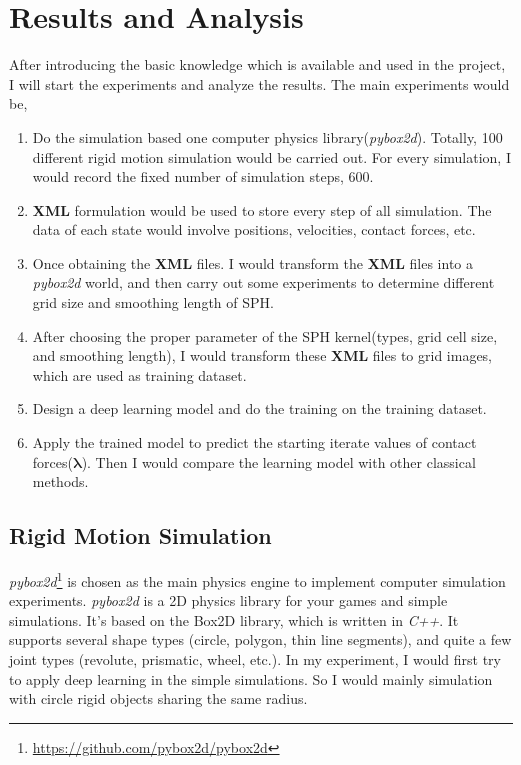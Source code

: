\chapter{Results and Analysis}
\label{details}
After introducing the basic knowledge which is available and used in the project, I will start the experiments and analyze the results. The main experiments would be,
\begin{enumerate}
    \item Do the simulation based one computer physics library(\textit{pybox2d}). Totally, 100 different rigid motion simulation would be carried out. For every simulation, I would record the fixed number of simulation steps, $600$.
    \item \textbf{XML} formulation would be used to store every step of all simulation. The data of each state would involve positions, velocities, contact forces, etc.
    \item Once obtaining the \textbf{XML} files. I would transform the \textbf{XML} files into a \textit{pybox2d} world, and then carry out some experiments to determine different grid size and smoothing length of SPH.
    \item After choosing the proper parameter of the SPH kernel(types, grid cell size, and smoothing length), I would transform these \textbf{XML} files to grid images, which are used as training dataset. 
    \item Design a deep learning model and do the training on the training dataset.
    \item Apply the trained model to predict the starting iterate values of contact forces($\pmb{\lambda}$). Then I would compare the learning model with other classical methods.
\end{enumerate}

\section{Rigid Motion Simulation}

\textit{pybox2d}\footnote{\url{https://github.com/pybox2d/pybox2d}} is chosen as the main physics engine to implement computer simulation experiments. \textit{pybox2d} is a 2D physics library for your games and simple simulations. It's based on the Box2D library, which is written in \textit{C++}. It supports several shape types (circle, polygon, thin line segments), and quite a few joint types (revolute, prismatic, wheel, etc.). In my experiment, I would first try to apply deep learning in the simple simulations. So I would mainly simulation with circle rigid objects sharing the same radius. 

